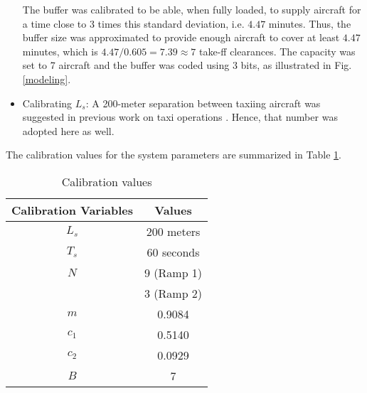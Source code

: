 \documentclass[letterpaper]{article}
\begin{document}
\begin{itemize}
The buffer was calibrated to be able, when fully loaded, to supply aircraft for a time close to 3 times this standard deviation, i.e. $4.47$ minutes. 
Thus,  the buffer size was approximated to provide enough aircraft to cover at least $4.47$ minutes, which is $4.47/0.605 = 7.39 \approx 7$ take-ff 
clearances. The capacity was set to 7 aircraft and the buffer was coded using 3 bits, as illustrated in Fig. \ref{modeling}.


\item Calibrating $L_s$:
A 200-meter separation between taxiing aircraft was suggested in previous work on taxi operations \cite{Balakrishnan2007,Visser2003}. Hence, that number was adopted here as well.\\
\end{itemize}

The calibration values for the system parameters are summarized in Table \ref{table:calibration}.

\begin{table}[h]
  \caption{Calibration values}
  \begin{center}
\begin{tabular}{c|c}
  \hline
  \hline
  \textbf{Calibration Variables} & \textbf{Values}\\
\hline
  $L_{s}$ & 200 meters\\
  $T_{s}$ & 60 seconds\\
  $N$ & 9 (Ramp 1)\\
  & 3 (Ramp 2)\\
  $m$ & 0.9084\\
  $c_1$ & 0.5140\\
  $c_2$ & 0.0929\\
  $B$ & 7\\
  \hline
  \hline
\end{tabular}
\end{center}
\label{table:calibration}
\end{table}
\end{document}
